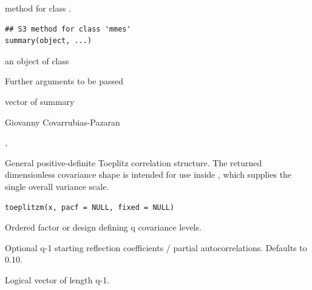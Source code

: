 \documentclass[a4paper]{book}
\begin{document}
%
\begin{Description}\relax
{} method for class .
\end{Description}
%
\begin{Usage}
\begin{verbatim}
## S3 method for class 'mmes'
summary(object, ...)
\end{verbatim}
\end{Usage}
%
\begin{Arguments}
\begin{ldescription}
\item[\code{object}] an object of class 
\item[\code{...}] Further arguments to be passed
\end{ldescription}
\end{Arguments}
%
\begin{Value}
vector of summary

\end{Value}
%
\begin{Author}\relax
Giovanny Covarrubias-Pazaran
\end{Author}
%
\begin{SeeAlso}\relax
{}, 
\end{SeeAlso}
%
\begin{Description}\relax
General positive-definite Toeplitz correlation structure. The returned dimensionless covariance shape is intended for use inside , which supplies the single overall variance scale.
\end{Description}
%
\begin{Usage}
\begin{verbatim}
toeplitzm(x, pacf = NULL, fixed = NULL)
\end{verbatim}
\end{Usage}
%
\begin{Arguments}
\begin{ldescription}
\item[\code{x}] Ordered factor or design defining q covariance levels.
\item[\code{pacf}] Optional q-1 starting reflection coefficients / partial autocorrelations.  Defaults to 0.10.
\item[\code{fixed}] Logical vector of length q-1.
\end{ldescription}
\end{Arguments}
\end{document}
